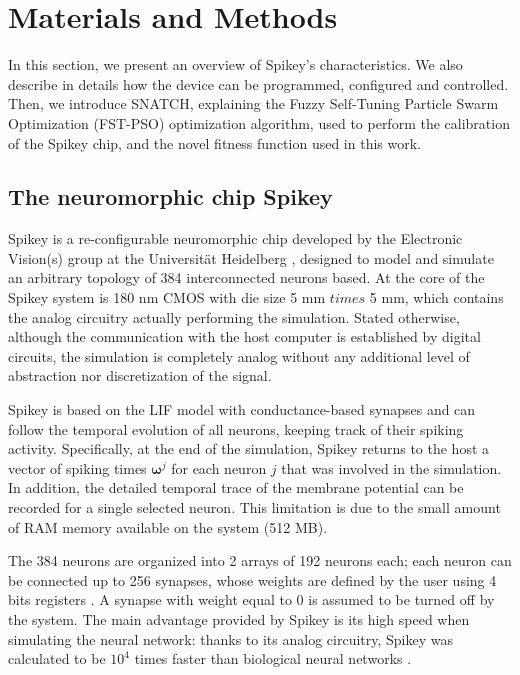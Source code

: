 \documentclass[utf8]{frontiersFPHY} %
\begin{document}
\section{Materials and Methods}
\label{sec:materials}
In this section, we present an overview of Spikey's characteristics. We also describe in details how the device can be programmed, configured and controlled. 
Then, we introduce SNATCH, explaining the Fuzzy Self-Tuning Particle Swarm Optimization (FST-PSO) optimization algorithm, used to perform the calibration of the Spikey chip, and the novel fitness function used in this work.

\subsection{The neuromorphic chip Spikey}
Spikey \citep{Pfeil2013}  is a re-configurable neuromorphic chip developed by the Electronic Vision(s) group at the Universit\"at Heidelberg \cite{Pfeil2013}, designed to model and simulate an arbitrary topology of 384 interconnected neurons based.
At the core of the Spikey system is 180 nm CMOS with die size 5 mm $times$ 5 mm, which contains the analog circuitry actually performing the simulation. 
Stated otherwise, although the communication with the host computer is established by digital circuits, the simulation is completely analog without any additional level of abstraction nor discretization of the signal.




Spikey is based on the LIF model with conductance-based synapses \cite{Schemmel2007} and can follow the temporal evolution of all neurons, keeping track of their spiking activity.
Specifically, at the end of the simulation, Spikey  returns to the host a vector of spiking times $\boldsymbol{\omega}^j$ for each neuron $j$ that was involved in the simulation.
In addition, the detailed temporal trace of the membrane potential can be recorded for a single selected neuron. 
This limitation is due to the small amount of RAM memory available on the system (512 MB).

The 384 neurons are organized into 2 arrays of 192 neurons each; each neuron can be connected up to 256 synapses, whose weights are defined by the user using 4 bits registers \cite{Pfeil2012}. 
A synapse with weight equal to 0 is assumed to be turned off by the system. 
The main advantage provided by Spikey is its high speed when simulating the neural network: thanks to its analog circuitry, Spikey was calculated to be  $10^4$ times faster than biological neural networks \cite{Pfeil2013}. 
\end{document}
